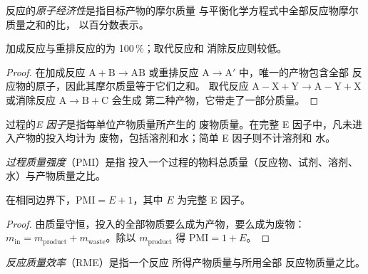 \begin{definition}[原子经济性]\label{def:b3:green-industrial:atom-economy}
反应的\emph{原子经济性}是指目标产物的摩尔质量
与平衡化学方程式中全部反应物摩尔质量之和的比，
以百分数表示。
\end{definition}

\begin{proposition}[按反应类型划分的原子经济性]\label{prop:b3:green-industrial:ae-classes}
加成反应与重排反应的为 100\,\%；取代反应和
消除反应则较低。
\end{proposition}

\begin{proof}
在加成反应 $\mathrm{A} + \mathrm{B} \to \mathrm{AB}$ 或重排反应 $\mathrm{A} \to \mathrm{A'}$ 中，唯一的产物包含全部
反应物的原子，因此其摩尔质量等于它们之和。
取代反应 $\mathrm{A{-}X} + \mathrm{Y} \to \mathrm{A{-}Y} + \mathrm{X}$ 或消除反应 $\mathrm{A} \to \mathrm{B} + \mathrm{C}$ 会生成
第二种产物，它带走了一部分质量。
\end{proof}

\begin{definition}[E 因子]\label{def:b3:green-industrial:e-factor}
过程的\emph{E 因子}是指每单位产物质量所产生的
废物质量。在完整 E 因子中，凡未进入产物的投入均计为
废物，包括溶剂和水；简单 E 因子则不计溶剂和
水。
\end{definition}

\begin{definition}[过程质量强度]\label{def:b3:green-industrial:pmi}
\emph{过程质量强度}（PMI）是指
投入一个过程的物料总质量（反应物、试剂、溶剂、
水）与产物质量之比。
\end{definition}

\begin{proposition}[PMI 与 E 因子]\label{prop:b3:green-industrial:pmi-e}
在相同边界下，$\mathrm{PMI} = E + 1$，其中 $E$ 为完整 E 因子。
\end{proposition}

\begin{proof}
由质量守恒，投入的全部物质要么成为产物，要么成为废物：
$m_{\mathrm{in}} = m_{\mathrm{product}} + m_{\mathrm{waste}}$。除以 $m_{\mathrm{product}}$ 得 $\mathrm{PMI} = 1 + E$。
\end{proof}

\begin{definition}[反应质量效率]\label{def:b3:green-industrial:rme}
\emph{反应质量效率}（RME）是指一个反应
所得产物质量与所用全部
反应物质量之比。
\end{definition}


